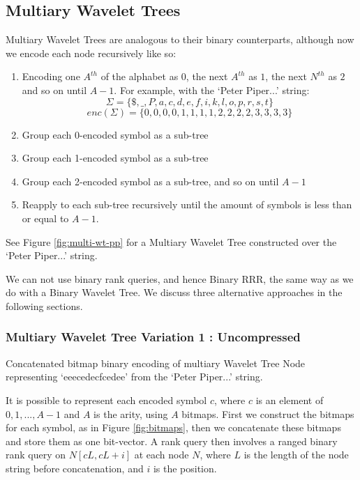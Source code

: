 \clearpage
\subsection{Multiary Wavelet Trees}
Multiary Wavelet Trees are analogous to their binary counterparts, although now 
we encode each node recursively like so:

\begin{enumerate}
    \item Encoding one $A^{th}$ of the alphabet as $0$, the next $A^{th}$ as 
		$1$, the next $N^{th}$ as $2$ and so on until $A-1$. For example, with 
		the `Peter Piper...' string:
		$$\Sigma = \{ \$, \_, P, a, c, d, e, f, i, k, l, o, p, r, s, t \}$$
	   	$$enc(\Sigma) = \{  0,  0, 0, 0, 1, 1, 1, 1, 2, 2, 2, 2, 3, 3, 3, 3 \}$$
    \item Group each 0-encoded symbol as a sub-tree
    \item Group each 1-encoded symbol as a sub-tree
    \item Group each 2-encoded symbol as a sub-tree, and so on until $A-1$
    \item Reapply to each sub-tree recursively until the amount of symbols is
	less than or equal to $A - 1$.
\end{enumerate}

See Figure \ref{fig:multi-wt-pp} for a Multiary Wavelet Tree constructed over
the `Peter Piper...' string.

We can not use binary rank queries, and hence Binary RRR, the same way as we do 
with a Binary Wavelet Tree. We discuss three alternative approaches in the 
following sections.

\subsubsection{Multiary Wavelet Tree Variation 1 : Uncompressed}
		{Concatenated bitmap binary encoding of multiary Wavelet Tree Node
		representing `eeecedecfcedee' from the `Peter Piper...' string.}
		
It is possible to represent each encoded symbol $c$, where $c$ is an element of
${ 0, 1,..., A - 1}$ and $A$ is the arity, using $A$ bitmaps. First we construct
the bitmaps for each symbol, as in Figure \ref{fig:bitmaps}, then we concatenate 
these bitmaps and store them as one 
bit-vector. A rank query then involves a ranged binary rank query on $N[c L, c L 
+ i]$ at each node $N$, where $L$ is the length of the node string before 
concatenation, and $i$ is the position.

